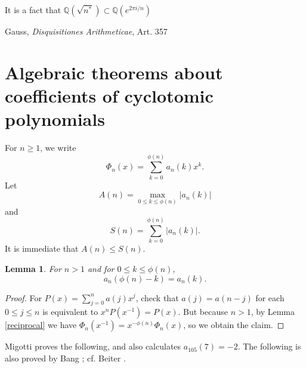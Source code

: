 \documentclass{amsart}
\newtheorem{lemma}[theorem]{Lemma}
\theoremstyle{definition}
\begin{document}
It is a fact that $\mathbb{Q}( \sqrt{n^*}) \subset \mathbb{Q}(e^{2\pi i/n})$ \cite[p.~19, Proposition 5.13]{kato2}









Gauss, {\em Disquisitiones Arithmeticae}, Art. 357






\section{Algebraic theorems about coefficients of cyclotomic polynomials}
For $n \geq 1$, we write 
\[
\Phi_n(x) = \sum_{k=0}^{\phi(n)} a_n(k) x^k.
\]
Let 
\[
A(n) = \max_{0 \leq k \leq \phi(n)} |a_n(k)|
\]
and
\[
S(n) = \sum_{k=0}^{\phi(n)} |a_n(k)|.
\]
It is immediate that $A(n) \leq S(n)$. 

\begin{lemma}
For $n>1$ and for $0 \leq k \leq \phi(n)$,
\[
a_n(\phi(n)-k) = a_n(k).
\]
\label{palindrome}
\end{lemma}
\begin{proof}
For $P(x) = \sum_{j=0}^n a(j) x^j$,  check that $a(j) = a(n-j)$ for each $0 \leq j \leq n$ is equivalent to
$x^n P(x^{-1}) = P(x)$.  But because $n>1$, by Lemma \ref{reciprocal} we have $\Phi_n(x^{-1})=x^{-\phi(n)} \Phi_n(x)$,
so we obtain the claim.
\end{proof}

Migotti \cite{migotti} proves the following, and also calculates $a_{105}(7)=-2$.
The following is also proved by Bang \cite{bang}; cf. Beiter \cite{beiter1964}.
\end{document}
